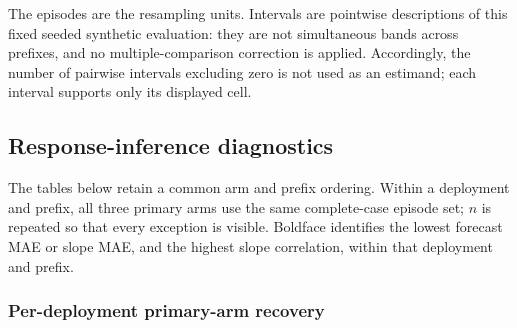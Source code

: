 The episodes are the resampling units. Intervals are pointwise descriptions of
this fixed seeded synthetic evaluation: they are not simultaneous bands across
prefixes, and no multiple-comparison correction is applied. Accordingly, the
number of pairwise intervals excluding zero is not used as an estimand; each
interval supports only its displayed cell.

\subsection{Response-inference diagnostics}
\label{app:coin-city-results}

The tables below retain a common arm and prefix ordering. Within a deployment and
prefix, all three primary arms use the same complete-case episode set; \(n\) is
repeated so that every exception is visible. Boldface identifies the lowest
forecast MAE or slope MAE, and the highest slope correlation, within that
deployment and prefix.

\subsubsection{Per-deployment primary-arm recovery}

